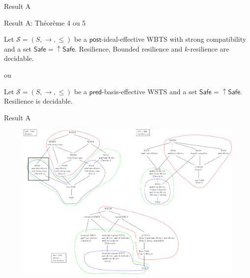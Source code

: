 \documentclass{beamer}
\newcommand{\pred}{\textsf{pred}}
\newcommand{\post}{\textsf{post}}
\newcommand{\Safe}{\textsf{Safe}}
\begin{document}
  \begin{frame}{Result A}
 
   
  
   
Result A: Théorème 4 ou 5


\setcounter{theorem}{3}

\begin{theorem}\label{down-up}
Let $\mathscr{S}=(S,\rightarrow, \leq)$ be a $\post$-ideal-effective WBTS with strong compatibility and a set $\Safe = \mathop{\uparrow} \Safe$.
{\sc Resilience}, {\sc Bounded resilience} 
and {\sc $k$-resilience} are decidable.
\end{theorem}

ou

\begin{theorem}\label{xxx}
Let $\mathscr{S}=(S,\rightarrow, \leq)$ be a $\pred$-basis-effective WSTS and a set $\Safe = \mathop{\uparrow} \Safe$.
 {\sc Resilience} is decidable.
\end{theorem}

    
  \end{frame}
  \begin{frame}{Result A}
 
   \begin{center}
 	\begin{figure}
 	\hspace{-2.cm}
\includegraphics[width=1.00\textwidth]{resultA}
	\end{figure}
\end{center}  

    
  \end{frame}
\end{document}
